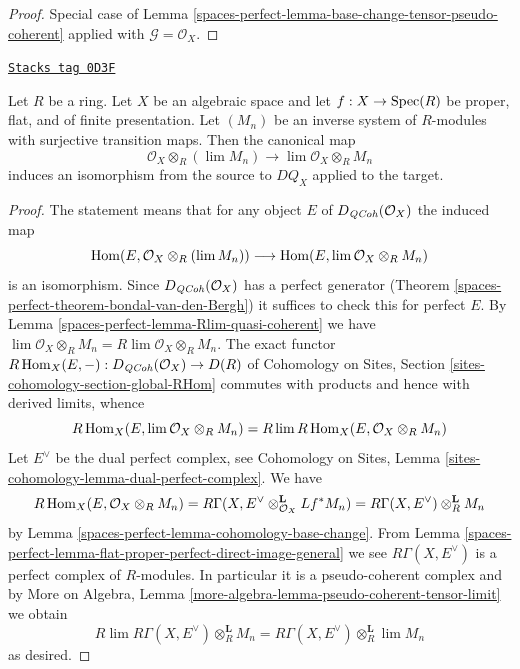\begin{proof}
Special case of
Lemma \ref{spaces-perfect-lemma-base-change-tensor-pseudo-coherent} applied with
$\mathcal{G} = \mathcal{O}_X$.
\end{proof}

\begin{lemma}
\label{spaces-perfect-lemma-pullback-and-limits}
\href{https://stacks.math.columbia.edu/tag/0D3F}{\texttt{Stacks tag 0D3F}}

Let $R$ be a ring. Let $X$ be an algebraic space and let
$f : X \to \operatorname{Spec}(R)$ be proper, flat, and
of finite presentation. Let $(M_n)$ be an inverse
system of $R$-modules with surjective transition maps.
Then the canonical map
$$
\mathcal{O}_X \otimes_R (\lim M_n)
\longrightarrow
\lim \mathcal{O}_X \otimes_R M_n
$$
induces an isomorphism from the source to $DQ_X$ applied to the target.
\end{lemma}

\begin{proof}
The statement means that for any object $E$ of
$D_{\mathit{QCoh}}(\mathcal{O}_X)$ the induced map
$$
\operatorname{Hom}(E, \mathcal{O}_X \otimes_R (\lim M_n))
\longrightarrow
\operatorname{Hom}(E, \lim \mathcal{O}_X \otimes_R M_n)
$$
is an isomorphism. Since $D_{\mathit{QCoh}}(\mathcal{O}_X)$ has
a perfect generator (Theorem \ref{spaces-perfect-theorem-bondal-van-den-Bergh})
it suffices to check this for perfect $E$.
By Lemma \ref{spaces-perfect-lemma-Rlim-quasi-coherent} we have
$\lim \mathcal{O}_X \otimes_R M_n = R\lim \mathcal{O}_X \otimes_R M_n$.
The exact functor
$R\operatorname{Hom}_X(E, -) : D_{\mathit{QCoh}}(\mathcal{O}_X) \to D(R)$
of Cohomology on Sites, Section \ref{sites-cohomology-section-global-RHom}
commutes with products and hence with derived limits, whence
$$
R\operatorname{Hom}_X(E, \lim \mathcal{O}_X \otimes_R M_n) =
R\lim R\operatorname{Hom}_X(E, \mathcal{O}_X \otimes_R M_n)
$$
Let $E^\vee$ be the dual perfect complex, see
Cohomology on Sites, Lemma \ref{sites-cohomology-lemma-dual-perfect-complex}.
We have
$$
R\operatorname{Hom}_X(E, \mathcal{O}_X \otimes_R M_n) =
R\Gamma(X, E^\vee \otimes_{\mathcal{O}_X}^\mathbf{L} Lf^*M_n) =
R\Gamma(X, E^\vee) \otimes_R^\mathbf{L} M_n
$$
by Lemma \ref{spaces-perfect-lemma-cohomology-base-change}.
From Lemma \ref{spaces-perfect-lemma-flat-proper-perfect-direct-image-general}
we see $R\Gamma(X, E^\vee)$ is a perfect complex of $R$-modules.
In particular it is a pseudo-coherent complex and by
More on Algebra, Lemma \ref{more-algebra-lemma-pseudo-coherent-tensor-limit}
we obtain
$$
R\lim R\Gamma(X, E^\vee) \otimes_R^\mathbf{L} M_n =
R\Gamma(X, E^\vee) \otimes_R^\mathbf{L} \lim M_n
$$
as desired.
\end{proof}

